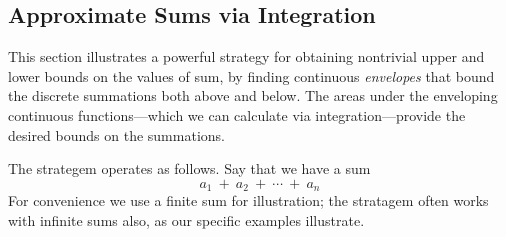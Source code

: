 \subsection{Approximate Sums via Integration}
\label{sec:riemann-bounds}

This section illustrates a powerful strategy for obtaining nontrivial
upper and lower bounds on the values of sum, by finding continuous {\em
  envelopes} that bound the discrete summations both above and below.
The areas under the enveloping continuous functions---which we can
calculate via integration---provide the desired bounds on the
summations.

The strategem operates as follows.  Say that we have a sum
\[ a_1 \ + \ a_2 \ + \ \cdots \ + \ a_n \]
For convenience we use a finite sum for illustration; the stratagem
often works with infinite sums also, as our specific examples
illustrate.
